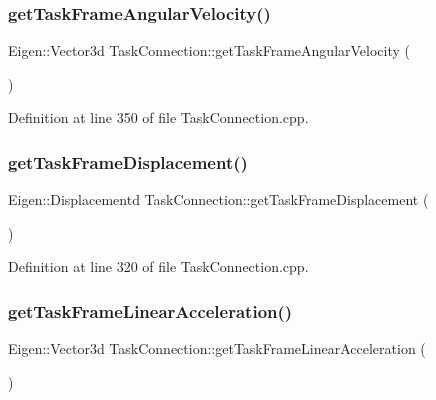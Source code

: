 \subsubsection{\texorpdfstring{get\+Task\+Frame\+Angular\+Velocity()}{getTaskFrameAngularVelocity()}}
{\footnotesize\ttfamily Eigen\+::\+Vector3d Task\+Connection\+::get\+Task\+Frame\+Angular\+Velocity (\begin{DoxyParamCaption}{ }\end{DoxyParamCaption})}



Definition at line 350 of file Task\+Connection.\+cpp.

\hypertarget{classocra__recipes_1_1TaskConnection_a4595bb517cd965bc9f08f609e3e15e78}{}\label{classocra__recipes_1_1TaskConnection_a4595bb517cd965bc9f08f609e3e15e78} 
\subsubsection{\texorpdfstring{get\+Task\+Frame\+Displacement()}{getTaskFrameDisplacement()}}
{\footnotesize\ttfamily Eigen\+::\+Displacementd Task\+Connection\+::get\+Task\+Frame\+Displacement (\begin{DoxyParamCaption}{ }\end{DoxyParamCaption})}



Definition at line 320 of file Task\+Connection.\+cpp.

\hypertarget{classocra__recipes_1_1TaskConnection_a4c489ec411ea7cb026213ac53111431d}{}\label{classocra__recipes_1_1TaskConnection_a4c489ec411ea7cb026213ac53111431d} 
\subsubsection{\texorpdfstring{get\+Task\+Frame\+Linear\+Acceleration()}{getTaskFrameLinearAcceleration()}}
{\footnotesize\ttfamily Eigen\+::\+Vector3d Task\+Connection\+::get\+Task\+Frame\+Linear\+Acceleration (\begin{DoxyParamCaption}{ }\end{DoxyParamCaption})}



